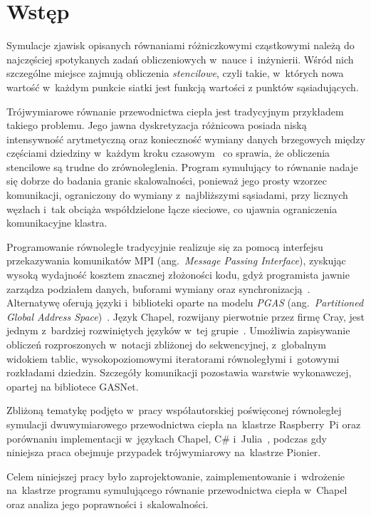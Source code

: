 \chapter*{Wstęp}
\label{ch:wstep}

Symulacje zjawisk opisanych równaniami różniczkowymi cząstkowymi należą do najczęściej
spotykanych zadań obliczeniowych w~nauce i~inżynierii. Wśród nich szczególne miejsce zajmują
obliczenia \emph{stencilowe}, czyli takie, w~których nowa wartość w~każdym punkcie siatki jest
funkcją wartości z punktów sąsiadujących.

Trójwymiarowe równanie przewodnictwa ciepła jest tradycyjnym przykładem takiego problemu.
Jego jawna dyskretyzacja różnicowa posiada niską intensywność arytmetyczną
oraz konieczność wymiany danych brzegowych między częściami dziedziny w~każdym kroku
czasowym~\cite{datta-stencil} co sprawia, że obliczenia stencilowe
są trudne do zrównoleglenia. Program symulujący to równanie nadaje się dobrze do badania granic skalowalności, ponieważ jego prosty wzorzec komunikacji, ograniczony do wymiany z~najbliższymi sąsiadami,
przy licznych węzłach i~tak obciąża współdzielone łącze sieciowe,
co ujawnia ograniczenia komunikacyjne klastra.

Programowanie równoległe tradycyjnie realizuje się za pomocą interfejsu
przekazywania komunikatów MPI (ang.~\emph{Message Passing Interface}), zyskując wysoką wydajność kosztem znacznej złożoności kodu, gdyż
programista jawnie zarządza podziałem danych, buforami wymiany oraz synchronizacją~\cite{mpi-standard}. Alternatywę
oferują języki i~biblioteki oparte na modelu \emph{PGAS} (ang.\ \emph{Partitioned Global Address
Space})~\cite{pgas}. Język Chapel,
rozwijany pierwotnie przez firmę Cray, jest
jednym z~bardziej rozwiniętych języków w~tej grupie~\cite{chapel-overview}. Umożliwia zapisywanie obliczeń
rozproszonych w~notacji zbliżonej do sekwencyjnej, z~globalnym widokiem tablic, wysokopoziomowymi
iteratorami równoległymi i~gotowymi rozkładami dziedzin. Szczegóły komunikacji pozostawia
warstwie wykonawczej, opartej na bibliotece GASNet.

Zbliżoną tematykę podjęto w~pracy współautorskiej
poświęconej równoległej symulacji dwuwymiarowego przewodnictwa ciepła na~klastrze Raspberry~Pi
oraz porównaniu implementacji w~językach Chapel, C\# i~Julia~\cite{falkowski2026parallel}, podczas
gdy niniejsza praca obejmuje przypadek trójwymiarowy na~klastrze Pionier.

Celem niniejszej pracy było zaprojektowanie, zaimplementowanie i~wdrożenie na~klastrze
programu symulującego równanie przewodnictwa ciepła w~Chapel oraz
analiza jego poprawności i~skalowalności.
